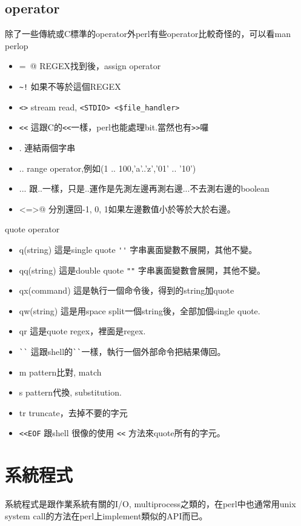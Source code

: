     \subsection{operator}
    除了一些傳統或C標準的operator外perl有些operator比較奇怪的，可以看man perlop
    \begin{itemize}
    \item \verb@=~@	    REGEX找到後，assign operator
    \item \verb=~!=	    如果不等於這個REGEX
    \item \verb=<>=	    stream read, \verb=<STDIO> <$file_handler>=
    \item \verb=<<=	    這跟C的\verb=<<=一樣，perl也能處理bit.當然也有\verb=>>=囉
    \item .	    連結兩個字串
    \item ..	    range operator,例如(1 .. 100,'a'..'z','01' .. '10')
    \item ...	    跟..一樣，只是..運作是先測左邊再測右邊...不去測右邊的boolean
    \item \verb@<=>@	    分別還回-1, 0, 1如果左邊數值小於等於大於右邊。
    \end{itemize}
    quote operator
    \begin{itemize}
    \item q(string)	這是single quote \verb=''= 字串裏面變數不展開，其他不變。
    \item qq(string)	這是double quote \verb=""= 字串裏面變數會展開，其他不變。
    \item qx(command)	這是執行一個命令後，得到的string加quote
    \item qw(string)	這是用space split一個string後，全部加個single quote.
    \item qr	        這是quote regex，裡面是regex.
    \item \verb=``=	這跟shell的\verb=``=一樣，執行一個外部命令把結果傳回。
    \item m		pattern比對, match
    \item s		pattern代換, substitution.
    \item tr		truncate，去掉不要的字元
    \item \verb=<<EOF=  跟shell 很像的使用 \verb=<<= 方法來quote所有的字元。
    \end{itemize}
    
    \section{系統程式}
    系統程式是跟作業系統有關的I/O, multiprocess之類的，在perl中也通常用unix
    system call的方法在perl上implement類似的API而已。
